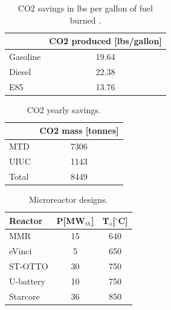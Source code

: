 \documentclass[11pt,letterpaper]{article}
\begin{document}
	\begin{table}[htbp!]
		\centering
	    \caption{\gls{CO2} savings in lbs per gallon of fuel burned \cite{energy_information_administration_how_2014}.}
		\begin{tabular}{|l|c|}
		\hline
		              & \gls{CO2} produced [lbs/gallon] \\ \hline
		Gasoline      & 19.64           \\
		Diesel        & 22.38           \\
		E85           & 13.76           \\ \hline
        \end{tabular}
        \label{tab:co2-eq}
	\end{table}

	\begin{table}[htbp!]
		\centering
	    \caption{\gls{CO2} yearly savings.}
		\begin{tabular}{|l|c|}
		\hline
		            & \gls{CO2} mass [tonnes] \\ \hline
		MTD      	& 7306           \\
		UIUC        & 1143           \\
		Total       & 8449           \\ \hline
        \end{tabular}
        \label{tab:co2}
	\end{table}


	\begin{table}[htbp!]
		\centering
	    \caption{Microreactor designs.}
		\begin{tabular}{|lcc|}
		\hline
		Reactor                                      & P[MW$_{th}$] & T$_o$[$^\circ$C] \\ \hline
		MMR \cite{usnc_mmr_2019}  		             & 15           & 640              \\
		eVinci \cite{hernandez_micro_2019}           & 5            & 650              \\
		ST-OTTO \cite{harlan_x-energy_2018}          & 30           & 750              \\
		U-battery \cite{ding_design_2011}            & 10           & 750              \\
		Starcore \cite{star_core_nuclear_star_2015}  & 36           & 850              \\ \hline
        \end{tabular}
        \label{tab:hydro-micro}
	\end{table}
\end{document}
